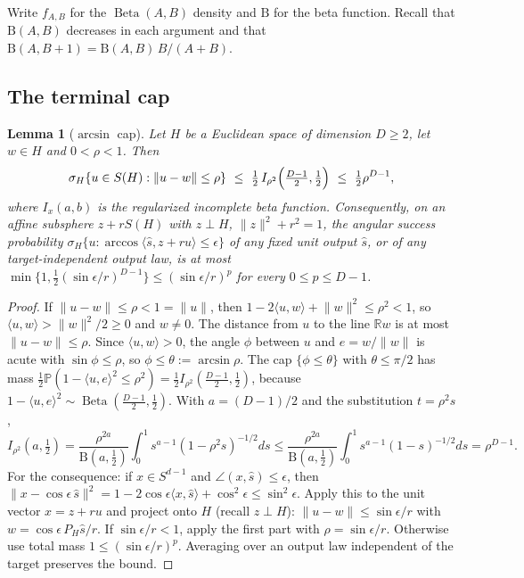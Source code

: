 \documentclass[11pt]{article}
\newtheorem{lemma}[theorem]{Lemma}
\theoremstyle{definition}
\theoremstyle{remark}
\newcommand{\R}{\mathbb R}
\newcommand{\Prob}{\mathbb P}
\newcommand{\ip}[2]{\langle #1,#2\rangle}
\newcommand{\norm}[1]{\lVert #1\rVert}
\DeclareMathOperator{\Beta}{Beta}
\newcommand{\B}{\mathrm B}
\begin{document}
Write \(f_{A,B}\) for the \(\Beta(A,B)\) density and \(\B\) for the beta
function. Recall that \(\B(A,B)\) decreases in each argument and that
\(\B(A,B+1)=\B(A,B)\,B/(A+B)\).

\subsection{The terminal cap}

\begin{lemma}[\(\arcsin\) cap]\label{lem:cap}
Let \(H\) be a Euclidean space of dimension \(D\ge2\), let
\(w\in H\) and \(0<\rho<1\). Then
\[
 \sigma_H\{u\in S(H):\norm{u-w}\le\rho\}\ \le\ \tfrac12\,I_{\rho^2}\Bigl(\tfrac{D-1}{2},\tfrac12\Bigr)\ \le\ \tfrac12\rho^{D-1},
\]
where \(I_x(a,b)\) is the regularized incomplete beta function.
Consequently, on an affine subsphere \(z+rS(H)\) with \(z\perp H\),
\(\norm z^2+r^2=1\), the angular success probability \(\sigma_H\{u:\arccos\ip{\widehat s}{z+ru}\le\epsilon\}\)
of any fixed unit output \(\widehat s\), or of any target-independent output law, is
at most \(\min\{1,\frac12(\sin\epsilon/r)^{D-1}\}\le(\sin\epsilon/r)^p\)
for every \(0\le p\le D-1\).
\end{lemma}
\begin{proof}
If \(\norm{u-w}\le\rho<1=\norm u\), then
\(1-2\ip uw+\norm w^2\le\rho^2<1\), so \(\ip uw>\norm w^2/2\ge0\) and
\(w\ne0\). The distance from \(u\) to the line \(\R w\) is at most
\(\norm{u-w}\le\rho\). Since \(\ip uw>0\), the angle \(\phi\) between \(u\)
and \(e=w/\norm w\) is acute with \(\sin\phi\le\rho\), so
\(\phi\le\theta:=\arcsin\rho\). The cap \(\{\phi\le\theta\}\) with
\(\theta\le\pi/2\) has mass
\(\frac12\Prob(1-\ip ue^2\le\rho^2)=\frac12 I_{\rho^2}(\frac{D-1}2,\frac12)\),
because \(1-\ip ue^2\sim\Beta(\frac{D-1}2,\frac12)\). With \(a=(D-1)/2\)
and the substitution \(t=\rho^2 s\),
\[
 I_{\rho^2}(a,\tfrac12)=\frac{\rho^{2a}}{\B(a,\frac12)}\int_0^1 s^{a-1}(1-\rho^2s)^{-1/2}ds
 \le\frac{\rho^{2a}}{\B(a,\frac12)}\int_0^1 s^{a-1}(1-s)^{-1/2}ds=\rho^{D-1}.
\]
For the consequence: if \(x\in S^{d-1}\) and \(\angle(x,\widehat s)\le\epsilon\), then
\(\norm{x-\cos\epsilon\,\widehat s}^2=1-2\cos\epsilon\ip x{\widehat s}+\cos^2\epsilon\le\sin^2\epsilon\).
Apply this to the unit vector \(x=z+ru\) and project onto \(H\) (recall \(z\perp H\)):
\(\norm{u-w}\le\sin\epsilon/r\) with \(w=\cos\epsilon\,P_H\widehat s/r\). If \(\sin\epsilon/r<1\), apply the
first part with \(\rho=\sin\epsilon/r\). Otherwise use total
mass \(1\le(\sin\epsilon/r)^p\). Averaging over an output law independent of the target
preserves the bound.
\end{proof}
\end{document}
